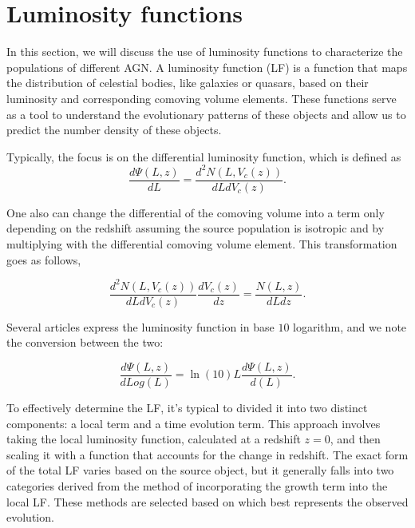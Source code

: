 \section{ Luminosity functions}
In this section, we will discuss the use of luminosity functions to characterize the populations of different AGN. 
A luminosity function (LF) is a function that maps the distribution of celestial bodies, like galaxies or quasars,
based on their luminosity and corresponding comoving volume elements. These functions serve as a tool to understand the evolutionary patterns of these objects and allow us 
to predict the number density of these objects. 

Typically, the focus is on the differential luminosity function, which is defined as
\begin{equation}
    \frac{d\Psi(L,z)}{dL} = \frac{d^2N(L,V_c(z))}{dLdV_c(z)}.
\end{equation}

One also can change the differential of the comoving volume into a term only depending on the redshift assuming the source population is isotropic and by multiplying with the differential comoving volume element. This 
transformation goes as follows, 

\begin{equation}
    \frac{d^2N(L,V_c(z))}{dLdV_c(z)}\frac{dV_c(z)}{dz} = \frac{N(L,z)}{dLdz}.
\end{equation}


Several articles express the luminosity function in base $10$ logarithm, and we note the conversion between the two:


\begin{equation}
    \frac{d\Psi(L,z)}{dLog(L)} =  \ln (10)  L \frac{d\Psi(L,z)}{d(L)}.
\end{equation}


To effectively determine the LF, it's typical to divided it into two distinct components: a local term and a time evolution term.
 This approach involves taking the local luminosity function, calculated at a redshift 
$z=0$, and then scaling it with a function that accounts for the change in redshift. 
The exact form of the total LF varies based on the source object, but it generally falls into two categories derived from the method of incorporating the growth term into the local LF.
 These methods are selected based on which best represents the observed evolution.

